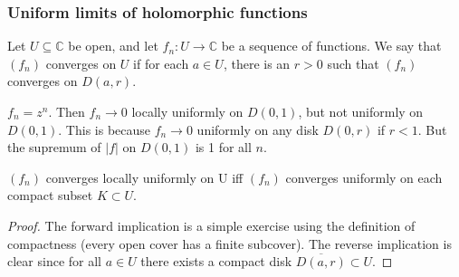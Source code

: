 \documentclass[egregdoesnotlikesansseriftitles,a4paper]{scrartcl}
\begin{document}
\subsubsection*{Uniform limits of holomorphic functions}
\begin{definition*}
      Let $U \subseteq \mathbb{C}$ be open, and let $f_{n}: U \rightarrow \mathbb{C}$ be a sequence of functions. We say that $(f_{n})$ converges  on $U$ if for each $a \in U$, there is an $r>0$ such that $(f_{n})$ converges on $D (a,r)$.
      \begin{example*}
            $f_{n}=z^{n}$. Then $f_{n}\rightarrow 0$ locally uniformly on $D (0,1)$, but not uniformly on $D (0,1)$. This is because $f_{n}\rightarrow 0$ uniformly on any disk $D (0,r)$ if $r<1$. But the supremum of $\left|f\right|$ on $D (0,1)$ is 1 for all $n$.
      \end{example*}
\end{definition*}
\begin{proposition}
      $(f_{n})$ converges locally uniformly on U iff $(f_{n})$ converges uniformly on each compact subset $K \subset U$.
      \begin{proof}
            The forward implication is a simple exercise using the definition of compactness (every open cover has a finite subcover). The reverse implication is clear since for all $a \in U$ there exists a compact disk $\overline{D (a,r)}\subset U$.
      \end{proof}
\end{proposition}
\end{document}
